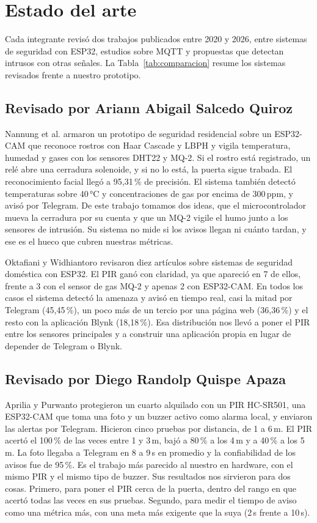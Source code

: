 \documentclass[manuscript,screen,nonacm]{acmart}
\begin{document}
\section{Estado del arte}
\label{sec:estado-arte}

Cada integrante revisó dos trabajos publicados entre 2020 y 2026, entre sistemas de seguridad con ESP32, estudios sobre MQTT y propuestas que detectan intrusos con otras señales. La Tabla~\ref{tab:comparacion} resume los sistemas revisados frente a nuestro prototipo.

\subsection{Revisado por Ariann Abigail Salcedo Quiroz}
Nannung et al. \cite{nannung2025iot} armaron un prototipo de seguridad residencial sobre un ESP32-CAM que reconoce rostros con Haar Cascade y LBPH y vigila temperatura, humedad y gases con los sensores DHT22 y MQ-2. Si el rostro está registrado, un relé abre una cerradura solenoide, y si no lo está, la puerta sigue trabada. El reconocimiento facial llegó a 95,31\,\% de precisión. El sistema también detectó temperaturas sobre 40\,°C y concentraciones de gas por encima de 300\,ppm, y avisó por Telegram. De este trabajo tomamos dos ideas, que el microcontrolador mueva la cerradura por su cuenta y que un MQ-2 vigile el humo junto a los sensores de intrusión. Su sistema no mide si los avisos llegan ni cuánto tardan, y ese es el hueco que cubren nuestras métricas.

Oktafiani y Widhiantoro \cite{oktafiani2025esp32} revisaron diez artículos sobre sistemas de seguridad doméstica con ESP32. El PIR ganó con claridad, ya que apareció en 7 de ellos, frente a 3 con el sensor de gas MQ-2 y apenas 2 con ESP32-CAM. En todos los casos el sistema detectó la amenaza y avisó en tiempo real, casi la mitad por Telegram (45,45\,\%), un poco más de un tercio por una página web (36,36\,\%) y el resto con la aplicación Blynk (18,18\,\%). Esa distribución nos llevó a poner el PIR entre los sensores principales y a construir una aplicación propia en lugar de depender de Telegram o Blynk.

\subsection{Revisado por Diego Randolp Quispe Apaza}
Aprilia y Purwanto \cite{aprilia2025boarding} protegieron un cuarto alquilado con un PIR HC-SR501, una ESP32-CAM que toma una foto y un buzzer activo como alarma local, y enviaron las alertas por Telegram. Hicieron cinco pruebas por distancia, de 1 a 6\,m. El PIR acertó el 100\,\% de las veces entre 1 y 3\,m, bajó a 80\,\% a los 4\,m y a 40\,\% a los 5\,m. La foto llegaba a Telegram en 8 a 9\,s en promedio y la confiabilidad de los avisos fue de 95\,\%. Es el trabajo más parecido al nuestro en hardware, con el mismo PIR y el mismo tipo de buzzer. Sus resultados nos sirvieron para dos cosas. Primero, para poner el PIR cerca de la puerta, dentro del rango en que acertó todas las veces en sus pruebas. Segundo, para medir el tiempo de aviso como una métrica más, con una meta más exigente que la suya (2\,s frente a 10\,s).
\end{document}

